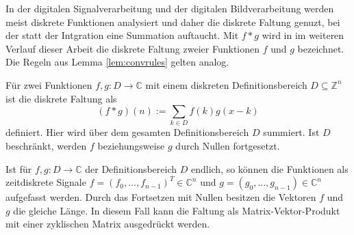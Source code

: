 
In der digitalen Signalverarbeitung und der digitalen Bildverarbeitung werden meist diskrete Funktionen analysiert und daher die diskrete Faltung genuzt, bei der statt der Intgration eine Summation auftaucht. Mit $f \ast g$ wird in im weiteren Verlauf dieser Arbeit die diskrete Faltung zweier Funktionen $f$ und $g$ bezeichnet. Die Regeln aus Lemma \ref{lem:convrules} gelten analog.

\begin{defi}\label{disk_faltung}
    Für zwei Funktionen $f,g: D \rightarrow \mathbb{C}$ mit einem diskreten Definitionsbereich $D \subseteq \mathbb{Z}^n$ ist die diskrete Faltung als
    \begin{equation*}
        (f \ast g) (n) := \sum_{k \in D} f(k) g(x-k)
    \end{equation*}
    definiert. Hier wird über dem gesamten Definitionsbereich $D$ summiert. Ist $D$ beschränkt, werden $f$ beziehungsweise $g$ durch Nullen fortgesetzt.  
\end{defi}

Ist für $f,g: D \rightarrow \mathbb{C}$ der Definitionsbereich $D$ endlich, so können die Funktionen als zeitdiskrete Signale $f=(f_0, \ldots, f_{n-1})^T \in \mathbb{C}^{n}$ und $g=(g_0, \ldots, g_{n-1}) \in \mathbb{C}^{n}$ aufgefasst werden. Durch das Fortsetzen mit Nullen besitzen die Vektoren $f$ und $g$ die gleiche Länge. In diesem Fall kann die Faltung als Matrix-Vektor-Produkt mit einer zyklischen Matrix ausgedrückt werden. 

